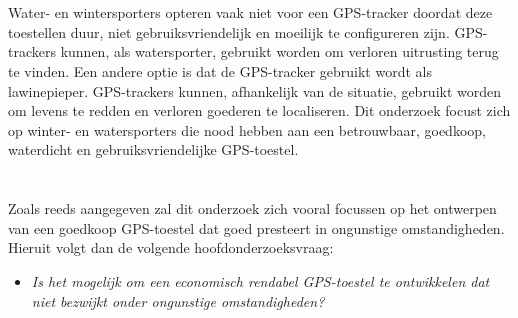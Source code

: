 \section{}
\label{sec:probleemstelling}

 Water- en wintersporters opteren vaak niet voor een GPS-tracker doordat deze toestellen duur, niet gebruiksvriendelijk en moeilijk te configureren zijn. GPS-trackers kunnen, als watersporter, gebruikt worden om verloren uitrusting terug te vinden. Een andere optie is dat de GPS-tracker gebruikt wordt als lawinepieper. GPS-trackers kunnen, afhankelijk van de situatie, gebruikt worden om levens te redden en verloren goederen te localiseren. Dit onderzoek focust zich op winter- en watersporters die nood hebben aan een betrouwbaar, goedkoop, waterdicht en gebruiksvriendelijke GPS-toestel.

\section{}
\subsection{}
\label{sec:onderzoeksvraag}

Zoals reeds aangegeven zal dit onderzoek zich vooral focussen op het ontwerpen van een goedkoop GPS-toestel dat goed presteert in ongunstige omstandigheden. Hieruit volgt dan de volgende hoofdonderzoeksvraag:
\newline
\begin{itemize}
	\item[] \textit{Is het mogelijk om een economisch rendabel GPS-toestel te ontwikkelen dat niet bezwijkt onder ongunstige omstandigheden?}
\end{itemize}

